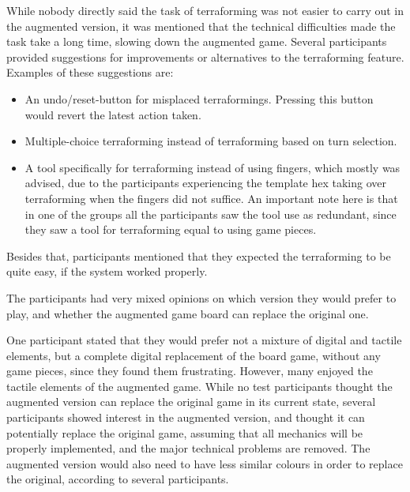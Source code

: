 While nobody directly said the task of terraforming was not easier to carry out in the augmented version, it was mentioned that the technical difficulties made the task take a long time, slowing down the augmented game. Several participants provided suggestions for improvements or alternatives to the terraforming feature. Examples of these suggestions are:
\begin{itemize}
\item An undo/reset-button for misplaced terraformings. Pressing this button would revert the latest action taken.
\item Multiple-choice terraforming instead of terraforming based on turn selection.
\item A tool specifically for terraforming instead of using fingers, which mostly was advised, due to the participants experiencing the template hex taking over terraforming when the fingers did not suffice. An important note here is that in one of the groups all the participants saw the tool use as redundant, since they saw a tool for terraforming equal to using game pieces.
\end{itemize}
Besides that, participants mentioned that they expected the terraforming to be quite easy, if the system worked properly. 

The participants had very mixed opinions on which version they would prefer to play, and whether the augmented game board can replace the original one.

One participant stated that they would prefer not a mixture of digital and tactile elements, but a complete digital replacement of the board game, without any game pieces, since they found them frustrating. However, many enjoyed the tactile elements of the augmented game. While no test participants thought the augmented version can replace the original game in its current state, several participants showed interest in the augmented version, and thought it can potentially replace the original game, assuming that all mechanics will be properly implemented, and the major technical problems are removed. The augmented version would also need to have less similar colours in order to replace the original, according to several participants.

